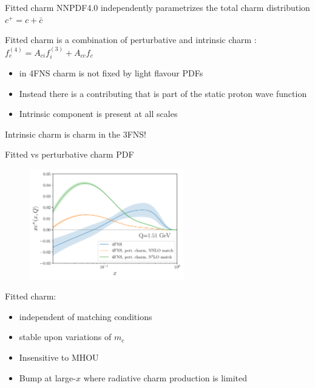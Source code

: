 \documentclass[aspectratio=43, 8pt,t]{beamer}
\begin{document}
\begin{frame}{Fitted charm}
  NNPDF4.0 independently parametrizes the total charm distribution $c^+=c+\bar{c}$

  \vspace*{1em}
  Fitted charm is a combination of perturbative and intrinsic charm : \\
  $f_c^{(4)} = A_{ci}f_i^{(3)}+A_{cc}f_c^{}$
  \begin{itemize}
    \item in 4FNS charm is not fixed by light flavour PDFs
    \item Instead there is a contributing that is part of the static proton wave function
    \item Intrinsic component is present at all scales
  \end{itemize}

  \vspace*{1em}
  Intrinsic charm is charm in the 3FNS!
\end{frame}

\begin{frame}{Fitted vs perturbative charm PDF}
  \begin{figure}
    \includegraphics[width=0.6\textwidth]{pch_vs_fitted_forward.pdf}
  \end{figure}

  Fitted charm:
  \begin{itemize}
    \item independent of matching conditions
    \item stable upon variations of $m_c$
    \item Insensitive to MHOU
    \item Bump at large-$x$ where radiative charm production is limited
  \end{itemize}
\end{frame}
\end{document}
